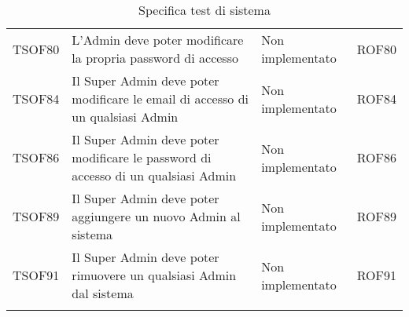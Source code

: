 \documentclass[../PianoDiQualifica.tex]{subfiles}
\begin{document}
\begin{longtable}[c] { >{\centering\arraybackslash}p{2cm} p{7cm} >{\centering\arraybackslash}p{4cm} >{\centering\arraybackslash}p{2cm}}
			\addlinespace[0.3em]
			\midrule
			\addlinespace[0.3em]
			TSOF80 & L'Admin deve poter modificare la propria password di accesso & Non implementato & ROF80 \\ 
			\addlinespace[0.3em]
			\midrule
			\addlinespace[0.3em]
			TSOF84 & Il Super Admin deve poter modificare le email di accesso di un qualsiasi Admin	& Non implementato & ROF84 \\ 
			\addlinespace[0.3em]
			\midrule
			\addlinespace[0.3em]
			TSOF86 & Il Super Admin deve poter modificare le password di accesso di un qualsiasi Admin & Non implementato & ROF86 \\ 
			\addlinespace[0.3em]
			\midrule
			\addlinespace[0.3em]
			TSOF89 & Il Super Admin deve poter aggiungere un nuovo Admin al sistema	 & Non implementato & ROF89 \\ 
			\addlinespace[0.3em]
			\midrule
			\addlinespace[0.3em]
			TSOF91 & Il Super Admin deve poter rimuovere un qualsiasi Admin dal sistema	 & Non implementato & ROF91 \\
		\bottomrule
		\caption{Specifica test di sistema}
	\end{longtable}

\begin{comment}	
	\newpage
	\subsection{Test di validazione}
	I test di validazione saranno organizzati nel modo seguente:
	\begin{center}
		\textbf{ TV[TipoRequisito][ImportanzaRequisito][IdRequisito]}
	\end{center}
	dove:
	\begin{itemize}
		\item \textbf{TipoRequisito} può assumere valori compresi tra:
		\begin{itemize}
			\item F per i requisiti funzionali;
			\item Q per i requisiti di qualità;
			\item V per i requisiti di vincolo;
			\item P per i requisiti prestazionali.
		\end{itemize}
		\item \textbf{ImportanzaRequisito} può assumere valori compresi tra:
		\begin{itemize}
			\item D per i requisiti desiderabili;
			\item O per i requisiti di obbligatori;
			\item F per i requisiti di facoltativi.
		\end{itemize}
		\item \textbf{IdRequisito} assume un valore gerarchico che identifica il singolo requisito.
	\end{itemize}
\end{comment}
			
\end{document}
